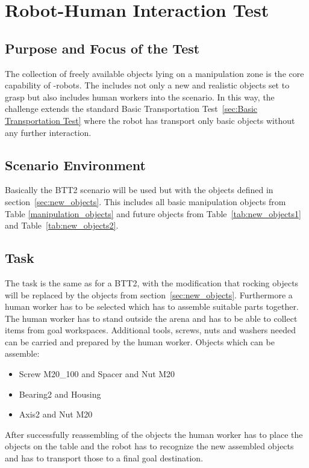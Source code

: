 \newpage
\section{Robot-Human Interaction Test}

\subsection{Purpose and Focus of the Test}
The collection of freely available objects lying on a manipulation zone is the core capability of \RCAW-robots. The  includes not only a new and realistic objects set to grasp but also includes human workers into the scenario. In this way, the challenge extends the standard Basic Transportation Test~\ref{sec:Basic Transportation Test} where the robot has transport only basic objects without any further interaction. 

\subsection{Scenario Environment}
Basically the BTT2 scenario will be used but with the objects defined in section~\ref{sec:new_objects}. This includes all basic manipulation objects from Table \ref{manipulation_objects} and future objects from Table~\ref{tab:new_objects1} and Table~\ref{tab:new_objects2}.

\subsection{Task}
The task is the same as for a BTT2, with the modification that rocking objects will be replaced by the objects from section~\ref{sec:new_objects}. Furthermore a human worker has to be selected which has to assemble suitable parts together. The human worker has to stand outside the arena and has to be able to collect items from goal workspaces. Additional tools, screws, nuts and washers needed can be carried and prepared by the human worker.
Objects which can be assemble: 
\begin{itemize}
	\item Screw M20\_100 and Spacer and Nut M20
	\item Bearing2 and  Housing
	\item Axis2 and Nut M20  
\end{itemize}

After successfully reassembling of the objects the human worker has to place the objects on the table and the robot has to recognize the new assembled objects and has to transport those to a final goal destination. 


